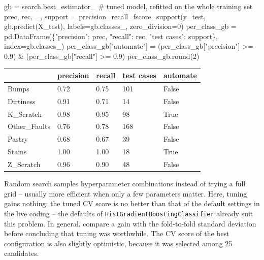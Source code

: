 \documentclass[
  letterpaper,
  DIV=11,
  numbers=noendperiod]{scrreprt}
\newenvironment{Shaded}{\begin{snugshade}}{\end{snugshade}}
\newcommand{\BuiltInTok}[1]{\textcolor[rgb]{0.00,0.23,0.31}{#1}}
\newcommand{\CommentTok}[1]{\textcolor[rgb]{0.37,0.37,0.37}{#1}}
\newcommand{\DecValTok}[1]{\textcolor[rgb]{0.68,0.00,0.00}{#1}}
\newcommand{\FloatTok}[1]{\textcolor[rgb]{0.68,0.00,0.00}{#1}}
\newcommand{\NormalTok}[1]{\textcolor[rgb]{0.00,0.23,0.31}{#1}}
\newcommand{\OperatorTok}[1]{\textcolor[rgb]{0.37,0.37,0.37}{#1}}
\newcommand{\StringTok}[1]{\textcolor[rgb]{0.13,0.47,0.30}{#1}}
\begin{document}
\begin{tcolorbox}
\begin{Shaded}
\begin{Highlighting}[]
\NormalTok{gb }\OperatorTok{=}\NormalTok{ search.best\_estimator\_                        }\CommentTok{\# tuned model, refitted on the whole training set}
\NormalTok{prec, rec, \_, support }\OperatorTok{=}\NormalTok{ precision\_recall\_fscore\_support(y\_test, gb.predict(X\_test), labels}\OperatorTok{=}\NormalTok{gb.classes\_, zero\_division}\OperatorTok{=}\DecValTok{0}\NormalTok{)}
\NormalTok{per\_class\_gb }\OperatorTok{=}\NormalTok{ pd.DataFrame(\{}\StringTok{"precision"}\NormalTok{: prec, }\StringTok{"recall"}\NormalTok{: rec, }\StringTok{"test cases"}\NormalTok{: support\}, index}\OperatorTok{=}\NormalTok{gb.classes\_)}
\NormalTok{per\_class\_gb[}\StringTok{"automate"}\NormalTok{] }\OperatorTok{=}\NormalTok{ (per\_class\_gb[}\StringTok{"precision"}\NormalTok{] }\OperatorTok{\textgreater{}=} \FloatTok{0.9}\NormalTok{) }\OperatorTok{\&}\NormalTok{ (per\_class\_gb[}\StringTok{"recall"}\NormalTok{] }\OperatorTok{\textgreater{}=} \FloatTok{0.9}\NormalTok{)}
\NormalTok{per\_class\_gb.}\BuiltInTok{round}\NormalTok{(}\DecValTok{2}\NormalTok{)}
\end{Highlighting}
\end{Shaded}

\begin{longtable}[]{@{}lllll@{}}
\toprule\noalign{}
& precision & recall & test cases & automate \\
\midrule\noalign{}
\endhead
\bottomrule\noalign{}
\endlastfoot
Bumps & 0.72 & 0.75 & 101 & False \\
Dirtiness & 0.91 & 0.71 & 14 & False \\
K\_Scratch & 0.98 & 0.95 & 98 & True \\
Other\_Faults & 0.76 & 0.78 & 168 & False \\
Pastry & 0.68 & 0.67 & 39 & False \\
Stains & 1.00 & 1.00 & 18 & True \\
Z\_Scratch & 0.96 & 0.90 & 48 & False \\
\end{longtable}

Random search samples hyperparameter combinations instead of trying a
full grid -- usually more efficient when only a few parameters matter.
Here, tuning gains nothing: the tuned CV score is no better than that of
the default settings in the live coding -- the defaults of
\texttt{HistGradientBoostingClassifier} already suit this problem. In
general, compare a gain with the fold-to-fold standard deviation before
concluding that tuning was worthwhile. The CV score of the best
configuration is also slightly optimistic, because it was selected among
25 candidates.


\end{tcolorbox}
\end{document}
